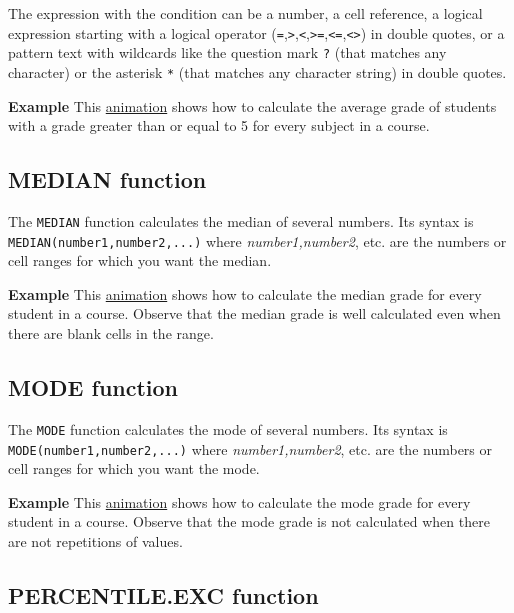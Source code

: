 The expression with the condition can be a number, a cell reference, a logical expression starting with a logical
operator
(\texttt{=},\texttt{\textgreater{}},\texttt{\textless{}},\texttt{\textgreater{}=},\texttt{\textless{}=},\texttt{\textless{}\textgreater{}})
in double quotes, or a pattern text with wildcards like the question mark \texttt{?} (that matches any character)
or the asterisk \texttt{*} (that matches any character string) in double quotes.

\textbf{Example} This \href{http://aprendeconalf.es/office/excel/manual/img/example_function_averageif.gif}{animation} shows how to calculate the average grade of students with a grade greater than or equal to 5 for every subject in a course.

\subsection{MEDIAN function}\hypertarget{median-function}{}\label{median-function}

The \texttt{MEDIAN} function calculates the median of several numbers. Its syntax is \texttt{MEDIAN(number1,number2,...)} where \emph{number1,number2}, etc. are the numbers or cell ranges for which you want the median.

\textbf{Example} This \href{http://aprendeconalf.es/office/excel/manual/img/example_function_median.gif}{animation} shows how to calculate the median grade for every student in a course. Observe that the median grade is well calculated even when there are blank cells in the range.

\subsection{MODE function}\hypertarget{mode-function}{}\label{mode-function}

The \texttt{MODE} function calculates the mode of several numbers. Its syntax is \texttt{MODE(number1,number2,...)} where \emph{number1,number2}, etc. are the numbers or cell ranges for which you want the mode.

\textbf{Example} This \href{http://aprendeconalf.es/office/excel/manual/img/example_function_mode.gif}{animation} shows how to calculate the mode grade for every student in a course. Observe that the mode grade is not calculated when there are not repetitions of values.

\subsection{PERCENTILE.EXC function}\hypertarget{percentileexc-function}{}\label{percentileexc-function}

